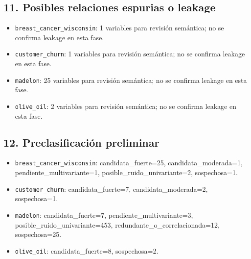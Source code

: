 \subsection{11. Posibles relaciones espurias o leakage}
\begin{itemize}
\item \texttt{breast\_cancer\_wisconsin}: 1 variables para revisión semántica; no se confirma leakage en esta fase.
\item \texttt{customer\_churn}: 1 variables para revisión semántica; no se confirma leakage en esta fase.
\item \texttt{madelon}: 25 variables para revisión semántica; no se confirma leakage en esta fase.
\item \texttt{olive\_oil}: 2 variables para revisión semántica; no se confirma leakage en esta fase.
\end{itemize}

\subsection{12. Preclasificación preliminar}
\begin{itemize}
\item \texttt{breast\_cancer\_wisconsin}: candidata\_fuerte=25, candidata\_moderada=1, pendiente\_multivariante=1, posible\_ruido\_univariante=2, sospechosa=1.
\item \texttt{customer\_churn}: candidata\_fuerte=7, candidata\_moderada=2, sospechosa=1.
\item \texttt{madelon}: candidata\_fuerte=7, pendiente\_multivariante=3, posible\_ruido\_univariante=453, redundante\_o\_correlacionada=12, sospechosa=25.
\item \texttt{olive\_oil}: candidata\_fuerte=8, sospechosa=2.
\end{itemize}


